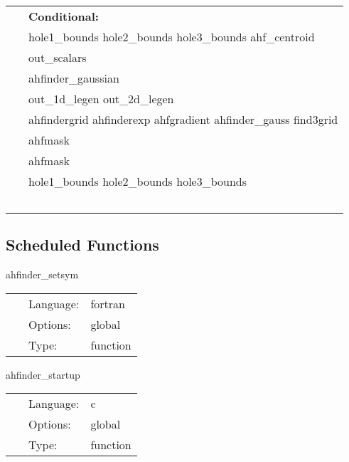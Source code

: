  \begin{tabular*}{160mm}{ll} 
~& {\bf Conditional:} \\ 
~ &  hole1\_bounds hole2\_bounds hole3\_bounds ahf\_centroid\\ 
~ &  out\_scalars\\ 
~ &  ahfinder\_gaussian\\ 
~ &  out\_1d\_legen out\_2d\_legen\\ 
~ &  ahfindergrid ahfinderexp ahfgradient ahfinder\_gauss find3grid\\ 
~ &  ahfmask\\ 
~ &  ahfmask\\ 
~ &  hole1\_bounds hole2\_bounds hole3\_bounds\\ 
~ & ~\\ 
\end{tabular*} 


\subsection*{Scheduled Functions}
\vspace{5mm}


\hspace{5mm} ahfinder\_setsym 

\hspace{5mm}{\it set symmetries for ahfinder grid functions } 


\hspace{5mm}

 \begin{tabular*}{160mm}{cll} 
~ & Language:  & fortran \\ 
~ & Options:  & global \\ 
~ & Type:  & function \\ 
\end{tabular*} 


\vspace{5mm}


\hspace{5mm} ahfinder\_startup 

\hspace{5mm}{\it register ahfinder as an io method } 


\hspace{5mm}

 \begin{tabular*}{160mm}{cll} 
~ & Language:  & c \\ 
~ & Options:  & global \\ 
~ & Type:  & function \\ 
\end{tabular*} 


